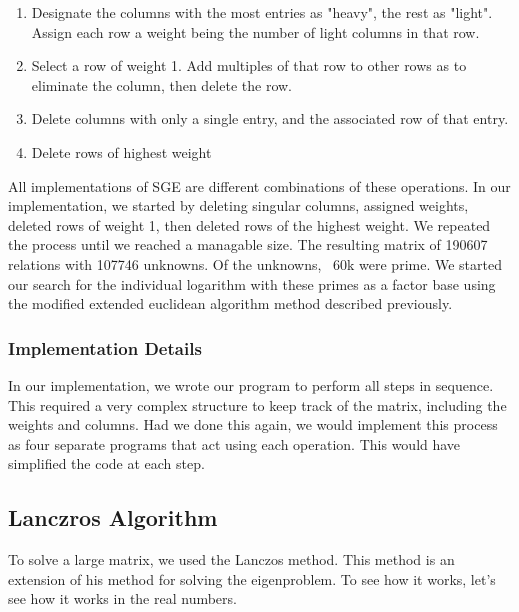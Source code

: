\documentclass{article}
\begin{document}
        \begin{enumerate}

          \item Designate the columns with the most entries as "heavy", the rest as "light". Assign each row a weight being the number of light columns in that row.

          \item Select a row of weight 1. Add multiples of that row to other rows as to eliminate the column, then delete the row.

          \item Delete columns with only a single entry, and the associated row of that entry.

          \item Delete rows of highest weight

        \end{enumerate}

        All implementations of SGE are different combinations of these operations. In our implementation, we started by deleting singular columns, assigned weights, deleted rows of weight 1, then deleted rows of the highest weight. We repeated the process until we reached a managable size. The resulting matrix of 190607 relations with 107746 unknowns. Of the unknowns, ~60k were prime. We started our search for the individual logarithm with these primes as a factor base using the modified extended euclidean algorithm method described previously.

        \subsubsection{Implementation Details}

        In our implementation, we wrote our program to perform all steps in sequence. This required a very complex structure to keep track of the matrix, including the weights and columns. Had we done this again, we would implement this process as four separate programs that act using each operation. This would have simplified the code at each step.

        \subsection{Lanczros Algorithm}

        To solve a large matrix, we used the Lanczos method\autocite{LaMaccia1991}. This method is an extension of his method for solving the eigenproblem. To see how it works, let's see how it works in the real numbers.
\end{document}
